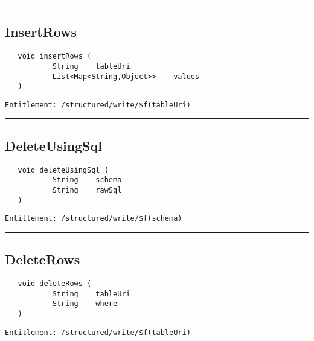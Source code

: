 \rule{12cm}{2pt}
\subsection{InsertRows}
\label{Api:InsertRows}
\begin{Verbatim}
   void insertRows (
           String    tableUri
           List<Map<String,Object>>    values
   )
\end{Verbatim}
\begin{Verbatim}[formatcom=\color{Maroon}]
  Entitlement: /structured/write/$f(tableUri)
\end{Verbatim}



\rule{12cm}{2pt}
\subsection{DeleteUsingSql}
\label{Api:DeleteUsingSql}
\begin{Verbatim}
   void deleteUsingSql (
           String    schema
           String    rawSql
   )
\end{Verbatim}
\begin{Verbatim}[formatcom=\color{Maroon}]
  Entitlement: /structured/write/$f(schema)
\end{Verbatim}



\rule{12cm}{2pt}
\subsection{DeleteRows}
\label{Api:DeleteRows}
\begin{Verbatim}
   void deleteRows (
           String    tableUri
           String    where
   )
\end{Verbatim}
\begin{Verbatim}[formatcom=\color{Maroon}]
  Entitlement: /structured/write/$f(tableUri)
\end{Verbatim}



